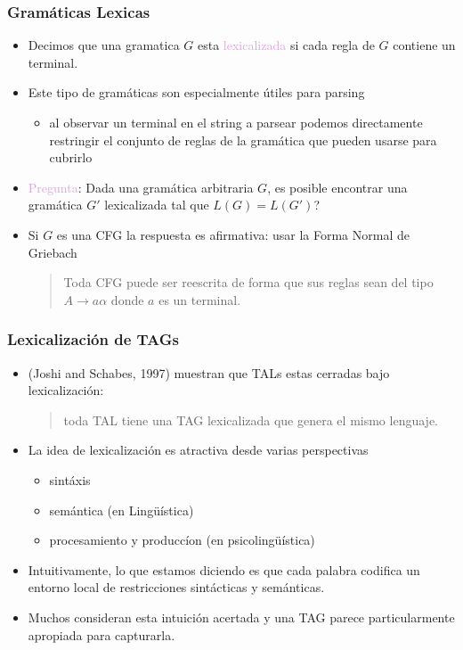 \documentclass[compress,color=usenames]{beamer}
\newcommand{\mH}[1]{\textcolor{Plum}{#1}}
\begin{document}
\begin{frame}
\frametitle{Gram\'aticas Lexicas}

\begin{itemize}
\item Decimos que una gramatica $G$ esta \mH{lexicalizada} si cada 
regla de $G$ contiene un terminal. \pause

\item Este tipo de gram\'aticas son especialmente \'utiles para parsing
\begin{itemize}
\item al observar un terminal en el string a parsear podemos directamente 
restringir el conjunto de reglas de la gram\'atica que pueden usarse para 
cubrirlo 
\end{itemize}

\item \mH{Pregunta}: Dada una gram\'atica arbitraria $G$, es posible encontrar
una gram\'atica $G'$ lexicalizada tal que $L(G) = L(G')$? \pause

\item Si $G$ es una CFG la respuesta es afirmativa: usar la Forma Normal de Griebach

\begin{quote}
Toda CFG puede ser reescrita de forma que sus reglas sean del tipo  $A \to a \alpha$ 
donde $a$ es un terminal.  
\end{quote} 

\end{itemize}
\end{frame}


\begin{frame}
\frametitle{Lexicalizaci\'on de TAGs}

\begin{itemize}

\item (Joshi and Schabes, 1997) muestran que TALs estas cerradas bajo lexicalizaci\'on:
\begin{quote}
toda TAL tiene una TAG lexicalizada que genera el mismo lenguaje. \pause
\end{quote}

\item La idea de lexicalizaci\'on es atractiva desde varias perspectivas
\begin{itemize}
\item sint\'axis
\item sem\'antica (en Ling\"u\'istica)
\item procesamiento y producc\'ion (en psicoling\"u\'istica)\pause
\end{itemize}

\item Intuitivamente, lo que estamos diciendo es que cada palabra codifica un entorno 
local de restricciones sint\'acticas y sem\'anticas. 

\item Muchos consideran esta intuici\'on acertada y una TAG parece particularmente 
apropiada para capturarla. 

\end{itemize}
\end{frame}
\end{document}
